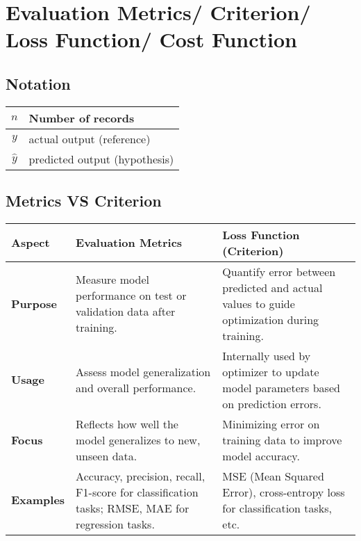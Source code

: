 \chapter{Evaluation Metrics/ Criterion/ Loss Function/ Cost Function}

\section*{Notation}
\begin{table}[h]
    \begin{tabular}{|c|l|}
        \hline
        
       $n$  & Number of records \\ 
       \hline
       
       $y$ & actual output (reference) \\ 
       \hline
       
       $\hat{y}$ & predicted output (hypothesis) \\ 
       \hline 
       
    \end{tabular}
\end{table}

\section*{Metrics VS Criterion}
\begin{table}[h]
    \centering
    \begin{tabular}{|p{2cm}|p{6cm}|p{6cm}|}
        \hline
        
        \textbf{Aspect} & \textbf{Evaluation Metrics} & \textbf{Loss Function (Criterion)} \\
        \hline
        
        \textbf{Purpose} & Measure model performance on test or validation data after training. & Quantify error between predicted and actual values to guide optimization during training. \\
        \hline
        
        \textbf{Usage} & Assess model generalization and overall performance. & Internally used by optimizer to update model parameters based on prediction errors. \\
        \hline
        
        \textbf{Focus} & Reflects how well the model generalizes to new, unseen data. & Minimizing error on training data to improve model accuracy. \\
        \hline

        \textbf{Examples} & Accuracy, precision, recall, F1-score for classification tasks; RMSE, MAE for regression tasks. & MSE (Mean Squared Error), cross-entropy loss for classification tasks, etc. \\
        \hline
    \end{tabular}
\end{table}

